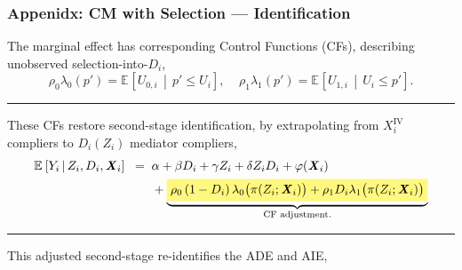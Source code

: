 \documentclass[dvipsnames]{beamer} %
\renewcommand{\vec}[1]{\boldsymbol{\mathit{#1}}}                           %
\newcommand{\E}[2][]{\mathbb{E}_{#1} \left[ #2 \right]}                    %
\newcommand{\Egiven}[3][]{\mathbb{E}_{#1} \left[ #2 \, \middle\vert \, #3 \right]} %
\renewcommand{\bar}[1]{\overline{#1}}                                      %
\newcommand{\eqhighlight}[2]{\colorbox{#1!50}{$\displaystyle#2$}}
\begin{document}
\begin{frame}[noframenumbering]
    \frametitle{Appenidx: CM with Selection --- Identification}
    The marginal effect has corresponding Control Functions (CFs), describing unobserved selection-into-$D_i$,
    \[ \rho_0 \lambda_0(p') = \Egiven{ U_{0,i} }{ p' \leq U_i }, \;\;\;\;
        \rho_1 \lambda_1(p') = \Egiven{ U_{1,i} }{ U_i \leq p' }. \]

    \vskip-0.25cm
    \par\noindent\rule{\textwidth}{0.4pt}
    These CFs restore second-stage identification, by extrapolating from $\vec X_i^{\text{IV}}$ compliers to $D_i(Z_i)$ mediator compliers,
    \begin{align*}
        \Egiven{Y_i}{Z_i, D_i, \vec X_i} \;\; =& \;\;
            \alpha
            + \beta D_i
            + \gamma Z_i
            + \delta Z_i D_i
            + \varphi(\vec X_i) \\
            & \;\; + \underbrace{\eqhighlight{yellow}{
                \rho_0 \left( 1 - D_i \right) \lambda_0 \big( \pi(Z_i ; \vec X_i) \big)
                + \rho_1 D_i \lambda_1 \big( \pi(Z_i ; \vec X_i) \big)}}_{
                    \text{CF adjustment.}}
    \end{align*}

    \par\noindent\rule{\textwidth}{0.4pt}
    This adjusted second-stage re-identifies the ADE and AIE,
    
    \makebox[\textwidth]{\parbox{1.25\textwidth}{
        \small
        \[ \text{ADE}
            = \E{\gamma + \delta D_i},
        \text{ AIE}
            = \mathbb E \Bigg[ \, \bar \pi \,
                \Big( \beta +  \delta Z_i +
                    \underbrace{ (\rho_1 - \rho_0) \,
                    \Gamma \big(\pi(0; \vec X_i), \, \pi(1; \vec X_i) \big)}_{
                        \text{Mediator compliers extrapolation.}} \Big) \Bigg] \]
    }}
\end{frame}
\end{document}
